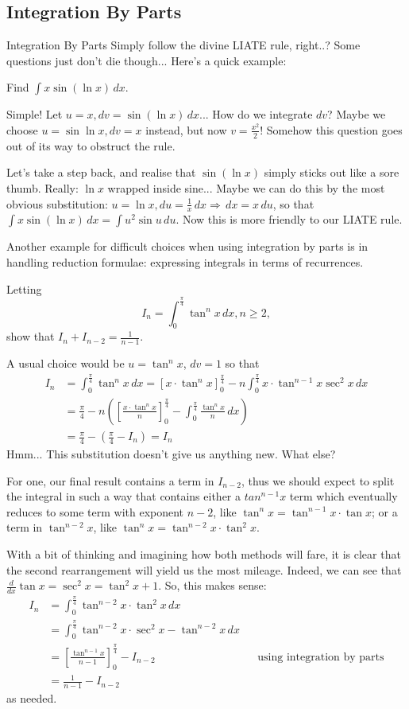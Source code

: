 \documentclass[../main.tex]{subfiles}
\begin{document}
\subsection{Integration By Parts}
{Integration By Parts}
Simply follow the divine LIATE rule, right..? Some questions just don't die though... Here's a quick example:
\begin{example}
Find $\int x\sin{(\ln{x})} \,dx$.
\end{example}
Simple! Let $u=x, dv=\sin{(\ln{x})} \,dx$... How do we integrate $dv$? Maybe we choose $u=\sin{\ln{x}}, dv=x$ instead, but now $v=\frac{x^2}{2}$! Somehow this question goes out of its way to obstruct the rule. 

Let's take a step back, and realise that $\sin{(\ln{x})}$ simply sticks out like a sore thumb. Really: $\ln x$ wrapped inside sine... Maybe we can do this by the most obvious substitution: $u=\ln x, du=\frac{1}{x} \,dx \Longrightarrow \,dx = x\,du$, so that $\int x\sin{(\ln x)} \,dx= \int u^2\sin{u} \,du$. Now this is more friendly to our LIATE rule.

Another example for difficult choices when using integration by parts is in handling reduction formulae: expressing integrals in terms of recurrences.
\begin{example}[Classic]
Letting $$I_n=\int_{0}^{\frac{\pi}{4}}\tan^n x\,dx, n\geq 2,$$
show that $I_n+I_{n-2}=\frac{1}{n-1}$.
\end{example}
A usual choice would be $u=\tan^n x$, $dv=1$ so that
\begin{align*}
    I_n&=\int_{0}^{\frac{\pi}{4}}\tan^n x \,dx = \left[x\cdot \tan^n x\right]_{0}^{\frac{\pi}{4}}-n\int_{0}^{\frac{\pi}{4}}x\cdot \tan^{n-1} x\sec^2x\,dx \\
    &=\frac{\pi}{4}-n\left(\left[\frac{x\cdot \tan^nx}{n}\right]_{0}^{\frac{\pi}{4}}-\int_{0}^{\frac{\pi}{4}}\frac{\tan^nx}{n}\,dx\right) \\
    &=\frac{\pi}{4}-\left(\frac{\pi}{4}-I_n\right) = I_n
\end{align*}
Hmm... This substitution doesn't give us anything new. What else?

For one, our final result contains a term in $I_{n-2}$, thus we should expect to split the integral in such a way that contains either a $tan^{n-1}x$ term which eventually reduces to some term with exponent $n-2$, like $\tan^nx=\tan^{n-1}x\cdot \tan x$; or a term in $\tan^{n-2}x$, like $\tan^n x=\tan^{n-2}x\cdot \tan^2x$.

With a bit of thinking and imagining how both methods will fare, it is clear that the second rearrangement will yield us the most mileage. Indeed, we can see that $\frac{d}{dx}\tan x=\sec^2x=\tan^2x+1$. So, this makes sense:
\begin{align*}
    I_n&=\int_{0}^{\frac{\pi}{4}}\tan^{n-2}x\cdot \tan^2x \,dx \\
    &=\int_{0}^{\frac{\pi}{4}}\tan^{n-2}x\cdot \sec^2x-\tan^{n-2}x \,dx \\
    &=\left[\frac{\tan^{n-1}x}{n-1}\right]_{0}^{\frac{\pi}{4}}-I_{n-2} &&\text{using integration by parts}\\
    &=\frac{1}{n-1}-I_{n-2}
\end{align*}
as needed.
\end{document}
